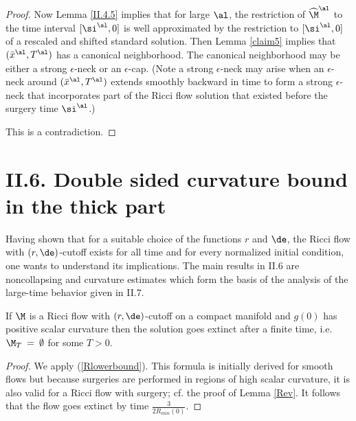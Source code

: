 \begin{proof}
Now Lemma \ref{II.4.5} implies that for large $\al$,
the restriction of
$\widehat\M^\al$ to the time interval $[\si^\al,0]$ is well
approximated by the restriction to $[\si^\al,0]$
of a rescaled and shifted standard
solution. Then Lemma \ref{claim5} implies that $(\bar x^\al,T^\al)$
has a canonical neighborhood.
The canonical neighborhood may be either a strong $\epsilon$-neck
or an $\epsilon$-cap. (Note
a strong $\epsilon$-neck may arise when an
$\epsilon$-neck around
$(\bar x^\al,T^\al)$ extends smoothly backward in time to form
a strong $\epsilon$-neck that incorporates part of the Ricci flow
solution that existed before the surgery time $\si^\al$.)

This is a contradiction.
\end{proof}

\section{II.6. Double sided curvature bound in the thick part}
\label{II.6}

Having shown that for a suitable choice of the functions $r$ and $\de$,
the Ricci flow with $(r,\de)$-cutoff exists for all time and for every
normalized initial condition, one wants to understand
its implications.
The main results in II.6 are noncollapsing and curvature estimates
which form the basis of the analysis of the large-time behavior given
in II.7.

\begin{lemma}
  \label{lem:kl-double-sided-curvature-bound-thick-part-compactness-thick-thin-geometry}
 \label{pscempty}
If $\M$ is a Ricci flow with $(r,\de)$-cutoff on a compact manifold and
$g(0)$ has positive scalar curvature then the solution goes extinct
after a finite time, i.e. $\M_T \: = \: \emptyset$ for some $T > 0$.
\end{lemma}
\begin{proof}
We apply (\ref{Rlowerbound}). This
formula is initially derived for smooth flows but because surgeries are
performed in regions of high scalar curvature, it is also valid for a Ricci
flow with surgery; cf. the proof of Lemma \ref{Rev}.
It follows that the flow goes extinct by time
$\frac{3}{2R_{min}(0)}$.
\end{proof}

